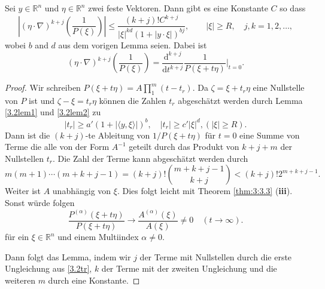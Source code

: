 \begin{lem}\label{3.2lem3}
Sei $y\in \mathbb R^n$ und $\eta \in \mathbb R^n$ zwei feste Vektoren. Dann gibt es eine Konstante $C$ so dass
\begin{equation}
\left |(\eta\cdot\nabla)^{k+j} \left ( \frac{1}{P(\xi)} \right )  \right | \le \frac{(k+j)! C^{k+j}}{|\xi|^{kd} ( 1+ | y\cdot\xi | )^{bj}},\qquad  |\xi|\ge R, \quad j, k=1,2,\ldots,
\end{equation}
wobei $b$ and $d$ aus dem vorigen Lemma seien. Dabei ist
\begin{equation}
(\eta\cdot\nabla)^{k+j} \left (\frac{1}{P(\xi)} \right ) =  \frac{\mathrm d^{k+j}}{\mathrm d t^{k+j}}  \frac{1}{P(\xi+ t\eta)} \bigg|_{t=0}.
\end{equation}
\end{lem}
\begin{proof}
Wir schreiben $P(\xi+t\eta) = A \prod_{1}^m (t-t_r) $. Da $\zeta = \xi+ t_r \eta$ eine Nullstelle von $P$ ist und $\zeta - \xi = t_r \eta$ können die Zahlen $t_r$ abgeschätzt werden durch Lemma \ref{3.2lem1} und \ref{3.2lem2} zu
\begin{equation}\label{3.2tr}
|t_r| \ge a' (1+|\langle y, \xi\rangle|)^b,\quad |t_r|\ge c' |\xi|^d, (|\xi|\ge R).
\end{equation}
Dann ist die $(k+j)$-te  Ableitung von $1/P(\xi+t\eta)$ für $t=0$ eine Summe von Terme die alle von der Form $A^{-1}$ geteilt durch das Produkt von $k+j+m$ der Nullstellen $t_r$. Die Zahl der Terme kann abgeschätzt werden durch
\begin{equation}
m(m+1) \cdots (m+k+j-1) =(k+j)! \binom{m+k+j-1}{k+j}<(k+j)! 2^{m+k+j-1}.
\end{equation}
Weiter ist $A$ unabhängig von $\xi$. Dies folgt leicht mit Theorem \ref{thm:3:3.3} ({\bf iii}). Sonst würde folgen 
\begin{equation}
\frac{P^{(\alpha)}(\xi + t\eta)}{P(\xi + t\eta)}\to \frac{A^{(\alpha)}(\xi)}{A(\xi)}\neq 0\quad(t\to \infty).
\end{equation}
für ein $\xi\in \mathbb R^n$ und einem Multiindex $\alpha\neq 0$.

Dann folgt das Lemma, indem wir $j$ der Terme mit Nullstellen durch die erste Ungleichung aus \eqref{3.2tr}, $k$ der Terme mit der zweiten Ungleichung und die weiteren $m$ durch eine Konstante.  
\end{proof}


